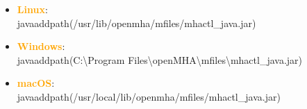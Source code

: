 \documentclass[11pt,a4paper,twoside]{article}
\newcommand{\+}{\discretionary{\mbox{\scriptsize$\hookleftarrow$}}{}{}}
\begin{document}
{{\begin{enumerate}
\begin{itemize}
\item \textcolor{orange}{\textbf{Linux}}: \\{\ttfamily javaaddpath(\textquotesingle{}/usr/lib/openmha/mfiles/mhactl\_java.jar\textquotesingle{})} 
\item \textcolor{orange}{\textbf{Windows}}: \\ {\ttfamily javaaddpath(\textquotesingle{}C:\textbackslash Program Files\textbackslash openMHA\textbackslash mfiles\textbackslash mhactl\_java.jar\textquotesingle{})}
\item \textcolor{orange}{\textbf{macOS}}: \\ {\ttfamily javaaddpath(\textquotesingle{}/usr/local/lib/openmha/mfiles/mhactl\_java.jar\textquotesingle{})}
\end{itemize}


\end{enumerate}}}
\end{document}
